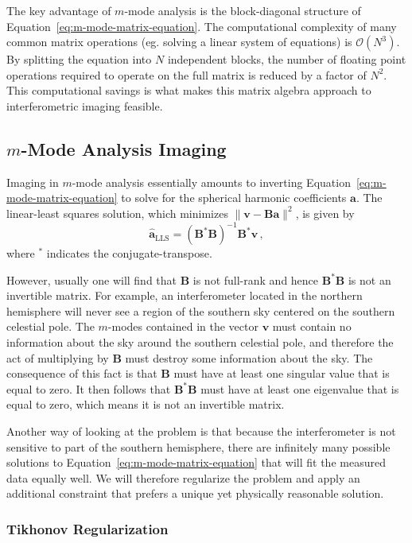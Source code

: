 \documentclass[twocolumn]{aastex61}
\renewcommand{\b}{\pmb}
\begin{document}
The key advantage of $m$-mode analysis is the block-diagonal structure of
Equation~\ref{eq:m-mode-matrix-equation}. The computational complexity of many common matrix
operations (eg. solving a linear system of equations) is $\mathcal{O}(N^3)$.  By splitting the
equation into $N$ independent blocks, the number of floating point operations required to operate on
the full matrix is reduced by a factor of $N^2$. This computational savings is what makes this
matrix algebra approach to interferometric imaging feasible.

\subsection{$m$-Mode Analysis Imaging}\label{sec:mmode-imaging}

Imaging in $m$-mode analysis essentially amounts to inverting
Equation~\ref{eq:m-mode-matrix-equation} to solve for the spherical harmonic coefficients $\b a$.
The linear-least squares solution, which minimizes $\|\b v - \b B\b a\|^2$, is given by
\begin{equation}
    \b{\hat a}_\text{LLS} = (\b B^*\b B)^{-1}\b B^*\b v\,,
\end{equation}
where $^*$ indicates the conjugate-transpose.

However, usually one will find that $\b B$ is not full-rank and hence $\b B^*\b B$ is not an
invertible matrix. For example, an interferometer located in the northern hemisphere will never see
a region of the southern sky centered on the southern celestial pole. The $m$-modes contained in the
vector $\b v$ must contain no information about the sky around the southern celestial pole, and
therefore the act of multiplying by $\b B$ must destroy some information about the sky. The
consequence of this fact is that $\b B$ must have at least one singular value that is equal to zero.
It then follows that $\b B^*\b B$ must have at least one eigenvalue that is equal to zero, which
means it is not an invertible matrix.

Another way of looking at the problem is that because the interferometer is not sensitive to part of
the southern hemisphere, there are infinitely many possible solutions to
Equation~\ref{eq:m-mode-matrix-equation} that will fit the measured data equally well.  We will
therefore regularize the problem and apply an additional constraint that prefers a unique yet
physically reasonable solution.

\subsubsection{Tikhonov Regularization}
\end{document}
